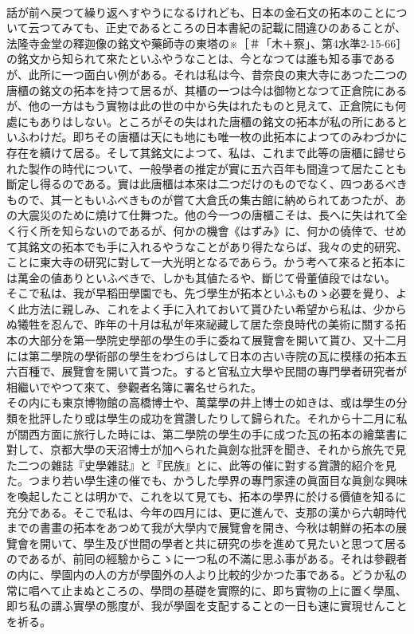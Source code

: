 \documentclass[8pt]{extreport}
\begin{document}
\begin{CJK}{UTF8}{min}
\\	話が前へ戻つて繰り返へすやうになるけれども、日本の金石文の拓本のことについて云つてみても、正史であるところの日本書紀の記載に間違ひのあることが、法隆寺金堂の釋迦像の銘文や藥師寺の東塔の※［＃「木＋察」、第4水準2-15-66］の銘文から知られて來たといふやうなことは、今となつては誰も知る事であるが、此所に一つ面白い例がある。それは私は今、昔奈良の東大寺にあつた二つの唐櫃の銘文の拓本を持つて居るが、其櫃の一つは今は御物となつて正倉院にあるが、他の一方はもう實物は此の世の中から失はれたものと見えて、正倉院にも何處にもありはしない。ところがその失はれた唐櫃の銘文の拓本が私の所にあるといふわけだ。即ちその唐櫃は天にも地にも唯一枚の此拓本によつてのみわづかに存在を續けて居る。そして其銘文によつて、私は、これまで此等の唐櫃に歸せられた製作の時代について、一般學者の推定が實に五六百年も間違つて居たことも斷定し得るのである。實は此唐櫃は本來は二つだけのものでなく、四つあるべきもので、其一ともいふべきものが嘗て大倉氏の集古館に納められてあつたが、あの大震災のために燒けて仕舞つた。他の今一つの唐櫃こそは、長へに失はれて全く行く所を知らないのであるが、何かの機會《はずみ》に、何かの僥倖で、せめて其銘文の拓本でも手に入れるやうなことがあり得たならば、我々の史的研究、ことに東大寺の研究に對して一大光明となるであらう。かう考へて來ると拓本には萬金の値ありといふべきで、しかも其値たるや、斷じて骨董値段ではない。
\\	そこで私は、我が早稻田學園でも、先づ學生が拓本といふものゝ必要を覺り、よく此方法に親しみ、これをよく手に入れておいて貰ひたい希望から私は、少からぬ犧牲を忍んで、昨年の十月は私が年來祕藏して居た奈良時代の美術に關する拓本の大部分を第一學院史學部の學生の手に委ねて展覽會を開いて貰ひ、又十二月には第二學院の學術部の學生をわづらはして日本の古い寺院の瓦に模樣の拓本五六百種で、展覽會を開いて貰つた。すると官私立大學や民間の專門學者研究者が相繼いでやつて來て、參觀者名簿に署名せられた。
\\	その内にも東京博物館の高橋博士や、萬葉學の井上博士の如きは、或は學生の分類を批評したり或は學生の成功を賞讚したりして歸られた。それから十二月に私が關西方面に旅行した時には、第二學院の學生の手に成つた瓦の拓本の繪葉書に對して、京都大學の天沼博士が加へられた眞劍な批評を聞き、それから旅先で見た二つの雜誌『史學雜誌』と『民族』とに、此等の催に對する賞讚的紹介を見た。つまり若い學生達の催でも、かうした學界の專門家達の眞面目な眞劍な興味を喚起したことは明かで、これを以て見ても、拓本の學界に於ける價値を知るに充分である。そこで私は、今年の四月には、更に進んで、支那の漢から六朝時代までの書畫の拓本をあつめて我が大學内で展覽會を開き、今秋は朝鮮の拓本の展覽會を開いて、學生及び世間の學者と共に研究の歩を進めて見たいと思つて居るのであるが、前囘の經驗からこゝに一つ私の不滿に思ふ事がある。それは參觀者の内に、學園内の人の方が學園外の人より比較的少かつた事である。どうか私の常に唱へて止まぬところの、學問の基礎を實際的に、即ち實物の上に置く學風、即ち私の謂ふ實學の態度が、我が學園を支配することの一日も速に實現せんことを祈る。

\end{CJK}
\end{document}
